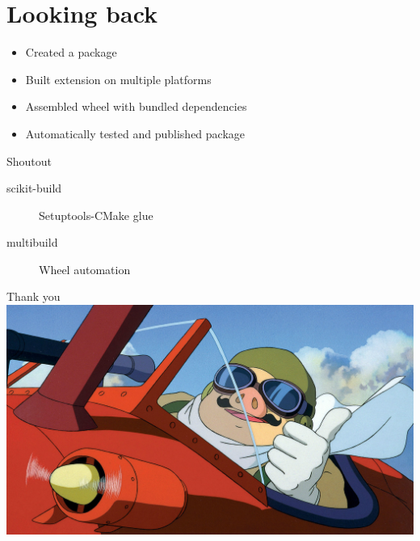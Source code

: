 \documentclass[pdf]{beamer}
\begin{document}
\section{Looking back}

\begin{frame}
    \begin{itemize}
        \item Created a package
        \item Built extension on multiple platforms
        \item Assembled wheel with bundled dependencies
        \item Automatically tested and published package
    \end{itemize}
\end{frame}

\begin{frame}{Shoutout}
    \begin{description}
        \item [scikit-build] Setuptools-CMake glue
        \item [multibuild] Wheel automation
    \end{description}
\end{frame}

\begin{frame}{Thank you}
    \includegraphics[width = \textwidth]{img/porcorosso.jpg}
\end{frame}
\end{document}
